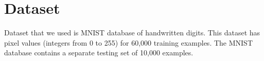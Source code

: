 \section{Dataset}
	Dataset that we used is MNIST database of handwritten digits. This dataset has pixel values (integers from 0 to 255) for 60,000 training examples. The MNIST database contains a separate testing set of 10,000 examples.